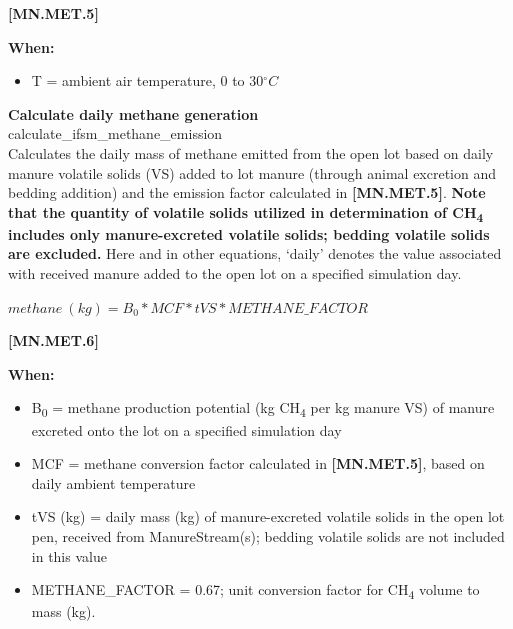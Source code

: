\begin{refsection}
            {\raggedleft \textbf{[MN.MET.5]}\par}
            \vspace{0.5cm} 

    \textbf{When:}

    \begin{itemize}
        \item T = ambient air temperature, 0 to 30\(^\circ C\)
    \end{itemize}
    \vspace{0.5cm}
    
    \textbf{Calculate daily methane generation}\\
    calculate\_ifsm\_methane\_emission\\

    Calculates the daily mass of methane emitted from the open lot based on daily manure volatile solids (VS) added to lot manure (through animal excretion and bedding addition) and the emission factor calculated in \textbf{[MN.MET.5]}. \textbf{Note that the quantity of volatile solids utilized in determination of CH\textsubscript{4} includes only manure-excreted volatile solids; bedding volatile solids are excluded.} Here and in other equations, ‘daily’ denotes the value associated with received manure added to the open lot on a specified simulation day.
    \vspace{0.25cm}
    
    \begin{center}
        \(methane\ (kg) = B_{0} * MCF * tVS* METHANE\_FACTOR\)
    \end{center}
        \vspace{0.5cm} 
    
            {\raggedleft \textbf{[MN.MET.6]}\par}
            \vspace{0.5cm} 

    \textbf{When:}

    \begin{itemize}
        \item B\textsubscript{0} = methane production potential (kg CH\textsubscript{4} per kg manure VS) of manure excreted onto the lot on a specified simulation day
        \item MCF = methane conversion factor calculated in \textbf{[MN.MET.5]}, based on daily ambient temperature
        \item tVS (kg) = daily mass (kg) of manure-excreted volatile solids in the open lot pen, received from ManureStream(s); bedding volatile solids are not included in this value
        \item METHANE\_FACTOR = 0.67; unit conversion factor for CH\textsubscript{4} volume to mass (kg).


\end{itemize}
\end{refsection}
